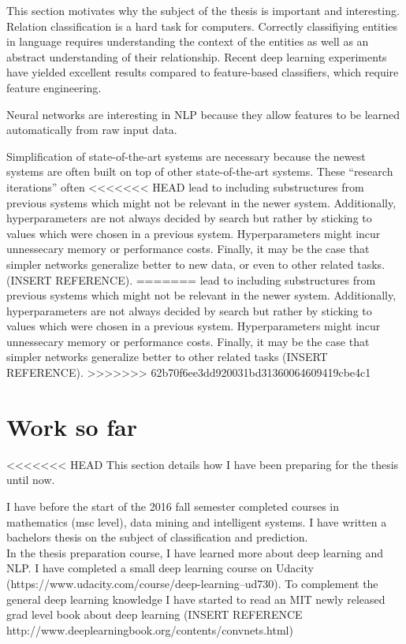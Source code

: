 \documentclass{article}
\begin{document}
This section motivates why the subject of the thesis is important and interesting.\\

Relation classification is a hard task for computers. Correctly classifiying entities in language requires understanding the context of the entities as well as an abstract understanding
of their relationship. Recent deep learning experiments have yielded excellent results compared to feature-based classifiers, which require feature engineering.   

Neural networks are interesting in NLP because they allow features to be learned automatically
from raw input data. 

Simplification of state-of-the-art systems are necessary because the newest systems are
often built on top of other state-of-the-art systems. These ``research iterations'' often
<<<<<<< HEAD
lead to including substructures from previous systems which might not be relevant in the newer system. Additionally, hyperparameters are not always decided by search but rather by sticking to values which were chosen in a previous system. Hyperparameters might incur unnessecary memory or performance costs. Finally, it may be the case that simpler networks generalize better to new data, or even 
to other related tasks. (INSERT REFERENCE).  
=======
lead to including substructures from previous systems which might not be relevant in the newer system. Additionally, hyperparameters are not always decided by search but rather by sticking to values which were chosen in a previous system. Hyperparameters might incur unnessecary memory or performance costs. Finally, it may be the case that simpler networks generalize better to other related tasks (INSERT REFERENCE).  
>>>>>>> 62b70f6ee3dd920031bd31360064609419cbe4c1


\section{Work so far}

<<<<<<< HEAD
This section details how I have been preparing for the thesis until now.

I have before the start of the 2016 fall semester completed courses in mathematics (msc level), data mining
and intelligent systems. I have written a bachelors thesis on the subject of classification and prediction.\\

In the thesis preparation course, I have learned more about deep learning and NLP. I have completed
a small deep learning course on Udacity (https://www.udacity.com/course/deep-learning--ud730).
To complement the general deep learning knowledge I have started to read an MIT newly released 
grad level book about deep learning (INSERT REFERENCE http://www.deeplearningbook.org/contents/convnets.html)
\end{document}
